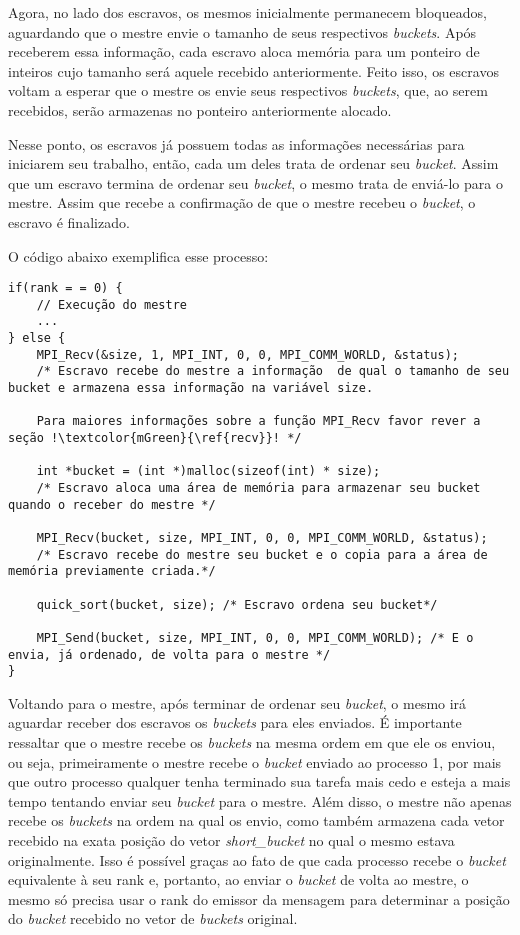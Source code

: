 			Agora, no lado dos escravos, os mesmos inicialmente permanecem bloqueados, aguardando que o mestre envie o tamanho de seus respectivos \textit{buckets}. Após receberem essa informação, cada escravo aloca memória para um ponteiro de inteiros cujo tamanho será aquele recebido anteriormente. Feito isso, os escravos voltam a esperar que o mestre os envie seus respectivos \textit{buckets}, que, ao serem recebidos, serão armazenas no ponteiro anteriormente alocado.
			
			Nesse ponto, os escravos já possuem todas as informações necessárias para iniciarem seu trabalho, então, cada um deles trata de ordenar seu \textit{bucket}. Assim que um escravo termina de ordenar seu \textit{bucket}, o mesmo trata de enviá-lo para o mestre. Assim que recebe a confirmação de que o mestre recebeu o \textit{bucket}, o escravo é finalizado.
			
			O código abaixo exemplifica esse processo:
			\begin{lstlisting}[style=C]		
if(rank = = 0) {
	// Execução do mestre
	...
} else {
	MPI_Recv(&size, 1, MPI_INT, 0, 0, MPI_COMM_WORLD, &status); 
	/* Escravo recebe do mestre a informação  de qual o tamanho de seu bucket e armazena essa informação na variável size.
	
	Para maiores informações sobre a função MPI_Recv favor rever a seção !\textcolor{mGreen}{\ref{recv}}! */
	
	int *bucket = (int *)malloc(sizeof(int) * size); 
	/* Escravo aloca uma área de memória para armazenar seu bucket quando o receber do mestre */ 

	MPI_Recv(bucket, size, MPI_INT, 0, 0, MPI_COMM_WORLD, &status); 
	/* Escravo recebe do mestre seu bucket e o copia para a área de memória previamente criada.*/

    quick_sort(bucket, size); /* Escravo ordena seu bucket*/

    MPI_Send(bucket, size, MPI_INT, 0, 0, MPI_COMM_WORLD); /* E o envia, já ordenado, de volta para o mestre */
}
\end{lstlisting}
			
			Voltando para o mestre, após terminar de ordenar seu \textit{bucket}, o mesmo irá aguardar receber dos escravos os \textit{buckets} para eles enviados. É importante ressaltar que o mestre recebe os \textit{buckets} na mesma ordem em que ele os enviou, ou seja, primeiramente o mestre recebe o \textit{bucket} enviado ao processo 1, por mais que outro processo qualquer tenha terminado sua tarefa mais cedo e esteja a mais tempo tentando enviar seu \textit{bucket} para o mestre. Além disso, o mestre não apenas recebe os \textit{buckets} na ordem na qual os envio, como também armazena cada vetor recebido na exata posição do vetor \textit{short\_bucket} no qual o mesmo estava originalmente. Isso é possível graças ao fato de que cada processo recebe o \textit{bucket} equivalente à seu rank e, portanto, ao enviar o \textit{bucket} de volta ao mestre, o mesmo só precisa usar o rank do emissor da mensagem para determinar a posição do \textit{bucket} recebido no vetor de \textit{buckets} original.
			
